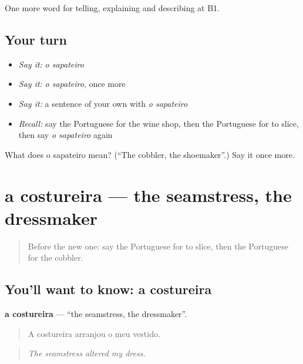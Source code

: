 \begin{grammarlens}[title={What you've built}]
One more word for telling, explaining and describing at B1.
\end{grammarlens}

\subsection*{Your turn}
\begin{itemize}
\raggedright
  \item \emph{Say it:} \emph{o sapateiro}
  \item \emph{Say it:} \emph{o sapateiro}, once more
  \item \emph{Say it:} a sentence of your own with \emph{o sapateiro}
  \item \emph{Recall:} say the Portuguese for the wine shop, then the Portuguese for to slice, then say \emph{o sapateiro} again
\end{itemize}

\begin{tcolorbox}[breakable,colback=teal!4,colframe=teal!35!black,title={Before you move on}]
What does o sapateiro mean? (\textquotedblleft{}The cobbler, the shoemaker\textquotedblright{}.) Say it once more.
\end{tcolorbox}
\section[a costureira]{a costureira — the seamstress, the dressmaker}

\label{lesson:PT-C451-costureira}



\begin{quote}
Before the new one: say the Portuguese for to slice, then the Portuguese for the cobbler.
\end{quote}

\subsection*{You'll want to know: a costureira}
\textbf{a costureira} — \textquotedblleft{}the seamstress, the dressmaker\textquotedblright{}.

\begin{quote}
A costureira arranjou o meu vestido.
\end{quote}

\begin{quote}
\emph{The seamstress altered my dress.}
\end{quote}

